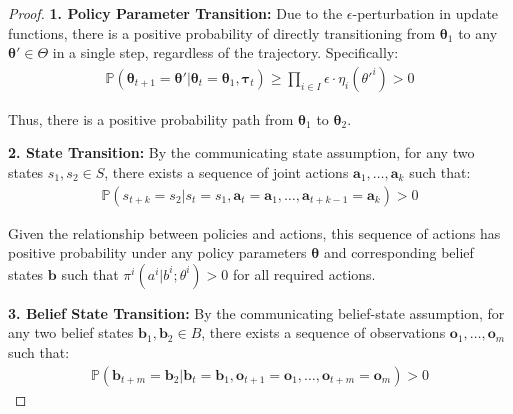\documentclass[a4paper,12pt]{report}
\begin{document}
\begin{proof}
    \textbf{1. Policy Parameter Transition:} Due to the
    $\epsilon$-perturbation in update functions, there is a positive probability of
    directly transitioning from $\boldsymbol{\theta}_{1}$ to any $\boldsymbol{\theta}
        ' \in \Theta$ in a single step, regardless of the trajectory. Specifically:
    \begin{align}
        \mathbb{P}(\boldsymbol{\theta}_{t+1}=\boldsymbol{\theta}'|\boldsymbol{\theta}_{t}=\boldsymbol{\theta}_{1}, \boldsymbol{\tau}_{t}) \geq \prod_{i \in I}\epsilon \cdot \eta_{i}(\theta'^{i}) > 0
    \end{align}

    Thus, there is a positive probability path from $\boldsymbol{\theta}_{1}$ to
    $\boldsymbol{\theta}_{2}$.

    \textbf{2. State Transition:} By the communicating
    state assumption, for any two states $s_{1}, s_{2} \in S$, there exists a
    sequence of joint actions $\boldsymbol{a}_{1}, \ldots, \boldsymbol{a}_{k}$
    such that:
    \begin{align}
        \mathbb{P}(s_{t+k}=s_{2}|s_{t}=s_{1}, \boldsymbol{a}_{t}=\boldsymbol{a}_{1}, \ldots, \boldsymbol{a}_{t+k-1}=\boldsymbol{a}_{k}) > 0
    \end{align}

    Given the relationship between policies and actions, this sequence of actions has
    positive probability under any policy parameters $\boldsymbol{\theta}$ and corresponding
    belief states $\boldsymbol{b}$ such that $\pi^{i}(a^{i}|b^{i}; \theta^{i}) > 0$
    for all required actions.

    \textbf{3. Belief State Transition:} By the communicating belief-state
    assumption, for any two belief states $\boldsymbol{b}_{1}, \boldsymbol{b}_{2} \in
        B$, there exists a sequence of observations
    $\boldsymbol{o}_{1}, \ldots, \boldsymbol{o}_{m}$ such that:
    \begin{align}
        \mathbb{P}(\boldsymbol{b}_{t+m}=\boldsymbol{b}_{2}|\boldsymbol{b}_{t}=\boldsymbol{b}_{1}, \boldsymbol{o}_{t+1}=\boldsymbol{o}_{1}, \ldots, \boldsymbol{o}_{t+m}=\boldsymbol{o}_{m}) > 0
    \end{align}


\end{proof}
\end{document}
